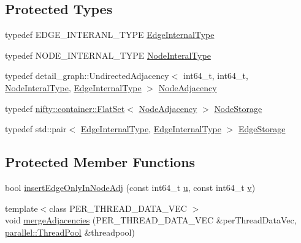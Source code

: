 \subsection*{Protected Types}
\begin{DoxyCompactItemize}
\item 
typedef E\+D\+G\+E\+\_\+\+I\+N\+T\+E\+R\+A\+N\+L\+\_\+\+T\+Y\+P\+E \hyperlink{classnifty_1_1graph_1_1UndirectedGraph_a70e38582c25deca5e0ce080277cb30fc}{Edge\+Internal\+Type}
\item 
typedef N\+O\+D\+E\+\_\+\+I\+N\+T\+E\+R\+N\+A\+L\+\_\+\+T\+Y\+P\+E \hyperlink{classnifty_1_1graph_1_1UndirectedGraph_aa3b43dd44281416b7232caae529e8780}{Node\+Interal\+Type}
\item 
typedef detail\+\_\+graph\+::\+Undirected\+Adjacency$<$ int64\+\_\+t, int64\+\_\+t, \hyperlink{classnifty_1_1graph_1_1UndirectedGraph_aa3b43dd44281416b7232caae529e8780}{Node\+Interal\+Type}, \hyperlink{classnifty_1_1graph_1_1UndirectedGraph_a70e38582c25deca5e0ce080277cb30fc}{Edge\+Internal\+Type} $>$ \hyperlink{classnifty_1_1graph_1_1UndirectedGraph_ab50d4774bd9a93ac226589352866df69}{Node\+Adjacency}
\item 
typedef \hyperlink{classnifty_1_1container_1_1FlatSet}{nifty\+::container\+::\+Flat\+Set}$<$ \hyperlink{classnifty_1_1graph_1_1UndirectedGraph_ab50d4774bd9a93ac226589352866df69}{Node\+Adjacency} $>$ \hyperlink{classnifty_1_1graph_1_1UndirectedGraph_a3a90ae1386fcc168216856934bf1ec24}{Node\+Storage}
\item 
typedef std\+::pair$<$ \hyperlink{classnifty_1_1graph_1_1UndirectedGraph_a70e38582c25deca5e0ce080277cb30fc}{Edge\+Internal\+Type}, \hyperlink{classnifty_1_1graph_1_1UndirectedGraph_a70e38582c25deca5e0ce080277cb30fc}{Edge\+Internal\+Type} $>$ \hyperlink{classnifty_1_1graph_1_1UndirectedGraph_a77256cc943f931180bf84b14d943f39a}{Edge\+Storage}
\end{DoxyCompactItemize}
\subsection*{Protected Member Functions}
\begin{DoxyCompactItemize}
\item 
bool \hyperlink{classnifty_1_1graph_1_1UndirectedGraph_a2a97f53b477b71af29c6e8409729e353}{insert\+Edge\+Only\+In\+Node\+Adj} (const int64\+\_\+t \hyperlink{classnifty_1_1graph_1_1UndirectedGraph_a65e4fc15d99d3198592231092dbd5cd3}{u}, const int64\+\_\+t \hyperlink{classnifty_1_1graph_1_1UndirectedGraph_a5d27d9bbc47026eda2223f53e41b1d22}{v})
\item 
{\footnotesize template$<$class P\+E\+R\+\_\+\+T\+H\+R\+E\+A\+D\+\_\+\+D\+A\+T\+A\+\_\+\+V\+E\+C $>$ }\\void \hyperlink{classnifty_1_1graph_1_1UndirectedGraph_a397456fa4036ba4606a375e3c78cb9d4}{merge\+Adjacencies} (P\+E\+R\+\_\+\+T\+H\+R\+E\+A\+D\+\_\+\+D\+A\+T\+A\+\_\+\+V\+E\+C \&per\+Thread\+Data\+Vec, \hyperlink{classnifty_1_1parallel_1_1ThreadPool}{parallel\+::\+Thread\+Pool} \&threadpool)
\end{DoxyCompactItemize}
